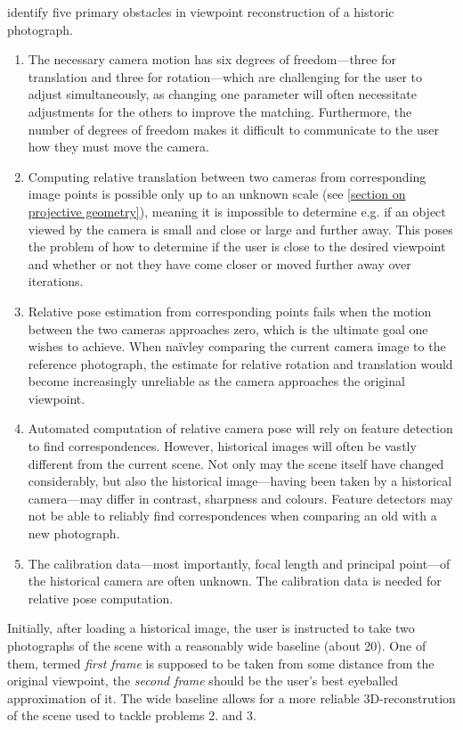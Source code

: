 \citet*{bae2010} identify five primary obstacles in viewpoint reconstruction of a
historic photograph.
\begin{enumerate}
   \item The necessary camera motion has six degrees of freedom---three for
      translation and three for rotation---which are challenging for the user
      to adjust simultaneously, as changing one parameter will often necessitate
      adjustments for the others to improve the matching. Furthermore, the
      number of degrees of freedom makes it difficult to communicate to the
      user how they must move the camera.
   \item Computing relative translation between two cameras from corresponding
      image points is possible only up to an unknown scale (see
      \autoref{section on projective geometry}), meaning it is impossible to
      determine e.g. if an object viewed by the camera is small and close or
      large and further away. This poses the problem of how to determine if the
      user is close to the desired viewpoint and whether or not they have come
      closer or moved further away over iterations. 
   \item Relative pose estimation from corresponding points fails when the
      motion between the two cameras approaches zero, which is the ultimate goal
      one wishes to achieve. When na\"ivley comparing the current camera image
      to the reference photograph, the estimate for relative rotation and
      translation would become increasingly unreliable as the camera approaches the
      original viewpoint.
   \item Automated computation of relative camera pose will rely on feature
      detection to find correspondences. However, historical images will often
      be vastly different from the current scene. Not only may the scene itself
      have changed considerably, but also the historical image---having been
      taken by a historical camera---may differ in contrast, sharpness and
      colours. Feature detectors may not be able to reliably find
      correspondences when comparing an old with a new photograph.
   \item The calibration data---most importantly, focal length and principal
      point---of the historical camera are often unknown. The calibration data
      is needed for relative pose computation.
\end{enumerate}

Initially, after loading a historical image, the user is instructed to
take two photographs of the scene with a reasonably wide baseline (about
20\textdegree). One of them, termed \emph{first frame} is supposed to be
taken from some distance from the original viewpoint, the \emph{second
frame} should be the user's best eyeballed approximation of it. The wide
baseline allows for a more reliable 3D-reconstrution of the scene used to
tackle problems 2. and 3. 

